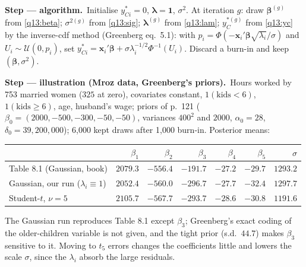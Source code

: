 \documentclass[11pt,a4paper]{article}
\numberwithin{equation}{questao}
\newcommand{\passo}[2]{\par\smallskip\noindent\textbf{Step --- #1.}~#2}
\begin{document}
\begin{sol}
\passo{algorithm}{Initialise $y_{Ci}^*=0$, $\boldsymbol\lambda=\mathbf1$, $\sigma^2$. At iteration $g$: draw $\boldsymbol\beta^{(g)}$ from \eqref{q13:beta};
$\sigma^{2(g)}$ from \eqref{q13:sig}; $\boldsymbol\lambda^{(g)}$ from \eqref{q13:lam}; $y_C^{*(g)}$ from \eqref{q13:yc} by the inverse-cdf
method (Greenberg eq.~5.1): with $p_i=\Phi(-\mathbf{x}_i'\boldsymbol\beta\sqrt{\lambda_i}/\sigma)$ and $U_i\sim\mathcal{U}(0,p_i)$, set
$y_{Ci}^*=\mathbf{x}_i'\boldsymbol\beta+\sigma\lambda_i^{-1/2}\Phi^{-1}(U_i)$. Discard a burn-in and keep $(\boldsymbol\beta,\sigma^2)$.}

\passo{illustration (Mroz data, Greenberg's priors)}{Hours worked by 753 married women ($325$ at zero),
covariates constant, $1(\text{kids}<6)$, $1(\text{kids}\ge6)$, age, husband's wage; priors of p.~121
($\beta_0=(2000,-500,-300,-50,-50)$, variances $400^2$ and $2000$, $\alpha_0=28$, $\delta_0=39{,}200{,}000$);
6{,}000 kept draws after 1{,}000 burn-in. Posterior means:
\begin{center}\small
\begin{tabular}{lrrrrrr}
\toprule
 & $\beta_1$ & $\beta_2$ & $\beta_3$ & $\beta_4$ & $\beta_5$ & $\sigma$\\
\midrule
Table 8.1 (Gaussian, book) & $2079.3$ & $-556.4$ & $-191.7$ & $-27.2$ & $-29.7$ & $1293.2$\\
Gaussian, our run ($\lambda_i\equiv1$) & $2052.4$ & $-560.0$ & $-296.7$ & $-27.7$ & $-32.4$ & $1297.7$\\
Student-$t$, $\nu=5$ & $2105.7$ & $-567.7$ & $-293.7$ & $-28.6$ & $-30.8$ & $1191.6$\\
\bottomrule
\end{tabular}
\end{center}
The Gaussian run reproduces Table 8.1 except $\beta_3$; Greenberg's exact coding of the older-children
variable is not given, and the tight prior (s.d.\ $44.7$) makes $\beta_3$ sensitive to it. Moving to
$t_5$ errors changes the coefficients little and lowers the scale $\sigma$, since the $\lambda_i$ absorb
the large residuals.}


\end{sol}
\end{document}
